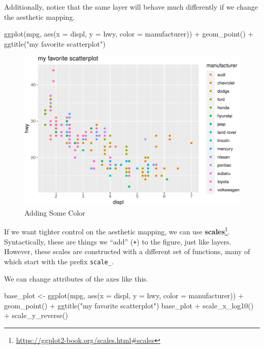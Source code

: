 \documentclass[
  12pt,
]{krantz}
\makeatletter
\newenvironment{Shaded}{\begin{snugshade}}{\end{snugshade}}
\newcommand{\AttributeTok}[1]{\textcolor[rgb]{0.61,0.61,0.61}{#1}}
\newcommand{\FunctionTok}[1]{\textcolor[rgb]{0,0,0}{#1}}
\newcommand{\NormalTok}[1]{#1}
\newcommand{\OtherTok}[1]{\textcolor[rgb]{0.37,0.37,0.37}{#1}}
\newcommand{\SpecialCharTok}[1]{\textcolor[rgb]{0,0,0}{#1}}
\newcommand{\StringTok}[1]{\textcolor[rgb]{0.5,0.5,0.5}{#1}}
\renewcommand{\href}[2]{#2\footnote{\url{#1}}}
\newenvironment{kframe}{%
\medskip{}
\setlength{\fboxsep}{.8em}
 \def\at@end@of@kframe{}%
 \ifinner\ifhmode%
  \def\at@end@of@kframe{\end{minipage}}%
  \begin{minipage}{\columnwidth}%
 \fi\fi%
 \def\FrameCommand##1{\hskip\@totalleftmargin \hskip-\fboxsep
 \colorbox{shadecolor}{##1}\hskip-\fboxsep
     \hskip-\linewidth \hskip-\@totalleftmargin \hskip\columnwidth}%
 \MakeFramed {\advance\hsize-\width
   \@totalleftmargin\z@ \linewidth\hsize
   \@setminipage}}%
 {\par\unskip\endMakeFramed%
 \at@end@of@kframe}
\renewenvironment{Shaded}{\begin{kframe}}{\end{kframe}}
\makeatother
\begin{document}
Additionally, notice that the same layer will behave much differently if we change the aesthetic mapping.

\begin{Shaded}
\begin{Highlighting}[]
\FunctionTok{ggplot}\NormalTok{(mpg, }\FunctionTok{aes}\NormalTok{(}\AttributeTok{x =}\NormalTok{ displ, }\AttributeTok{y =}\NormalTok{ hwy, }\AttributeTok{color =}\NormalTok{ manufacturer))  }\SpecialCharTok{+}
  \FunctionTok{geom\_point}\NormalTok{() }\SpecialCharTok{+} 
  \FunctionTok{ggtitle}\NormalTok{(}\StringTok{"my favorite scatterplot"}\NormalTok{)}
\end{Highlighting}
\end{Shaded}

\begin{figure}
\centering
\includegraphics{r_and_python_book_files/figure-latex/unnamed-chunk-171-1.pdf}
\caption{\label{fig:unnamed-chunk-171}Adding Some Color}
\end{figure}

If we want tighter control on the aesthetic mapping, we can use \href{https://ggplot2-book.org/scales.html\#scales}{\textbf{scales}}. Syntactically, these are things we ``add'' (\texttt{+}) to the figure, just like layers. However, these scales are constructed with a different set of functions, many of which start with the prefix \texttt{scale\_}.

We can change attributes of the axes like this.

\begin{Shaded}
\begin{Highlighting}[]
\NormalTok{base\_plot }\OtherTok{\textless{}{-}} \FunctionTok{ggplot}\NormalTok{(mpg, }\FunctionTok{aes}\NormalTok{(}\AttributeTok{x =}\NormalTok{ displ, }\AttributeTok{y =}\NormalTok{ hwy, }\AttributeTok{color =}\NormalTok{ manufacturer))  }\SpecialCharTok{+}
             \FunctionTok{geom\_point}\NormalTok{() }\SpecialCharTok{+} 
             \FunctionTok{ggtitle}\NormalTok{(}\StringTok{"my favorite scatterplot"}\NormalTok{)}
\NormalTok{base\_plot }\SpecialCharTok{+} \FunctionTok{scale\_x\_log10}\NormalTok{() }\SpecialCharTok{+} \FunctionTok{scale\_y\_reverse}\NormalTok{()}
\end{Highlighting}
\end{Shaded}
\end{document}
